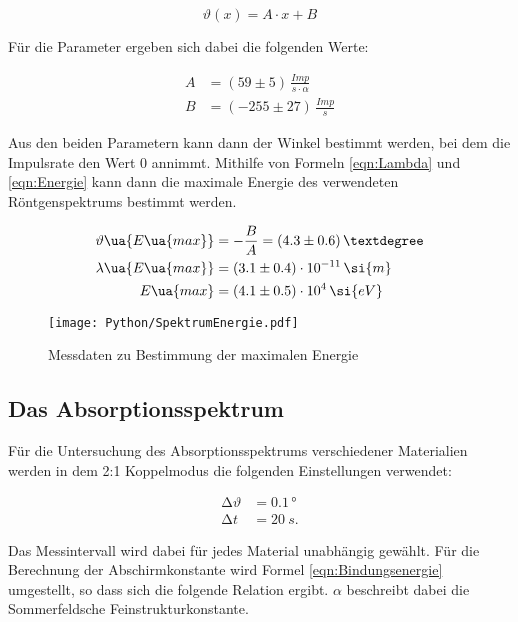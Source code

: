 \begin{equation}
  \vartheta(x) = A \cdot x + B
  \label{eqn:FitEmax}
\end{equation}

Für die Parameter ergeben sich dabei die folgenden Werte:

\begin{align*}
  A &= (59 \pm 5) \, \si{\frac{Imp}{s\cdot \alpha}} \\
  B &= (-255 \pm 27) \, \si{\frac{Imp}{s}}
\end{align*}

Aus den beiden Parametern kann dann der Winkel bestimmt werden, bei dem
die Impulsrate den Wert 0 annimmt. Mithilfe von Formeln \eqref{eqn:Lambda}
und \eqref{eqn:Energie} kann dann die maximale Energie des verwendeten
Röntgenspektrums bestimmt werden.

\begin{align*}
  \vartheta\ua{E\ua{max}} &= - \frac{B}{A} = (4.3 \pm 0.6) \, ° \\
  \lambda\ua{E\ua{max}} &= (3.1 \pm 0.4)  \cdot 10^{-11} \, \si{m} \\
  E\ua{max} &= (4.1 \pm 0.5) \cdot 10^{4}\, \si{eV}
\end{align*}



\begin{figure}
  \centering
  \texttt{[image: Python/SpektrumEnergie.pdf]}
  \caption{Messdaten zu Bestimmung der maximalen Energie}
  \label{fig:Emax}
\end{figure}



\newpage %

\subsection{Das Absorptionsspektrum}

Für die Untersuchung des Absorptionsspektrums verschiedener Materialien werden in dem
2:1 Koppelmodus die folgenden Einstellungen verwendet:

\begin{align*}
  \increment\vartheta &= 0.1 \,° \\
  \increment t     &= \SI{20}{s} .
\end{align*}

Das Messintervall wird dabei für jedes Material unabhängig gewählt. Für die
Berechnung der Abschirmkonstante wird Formel \eqref{eqn:Bindungsenergie} umgestellt,
so dass sich die folgende Relation ergibt.  $\alpha$
beschreibt dabei die Sommerfeldsche Feinstrukturkonstante.

